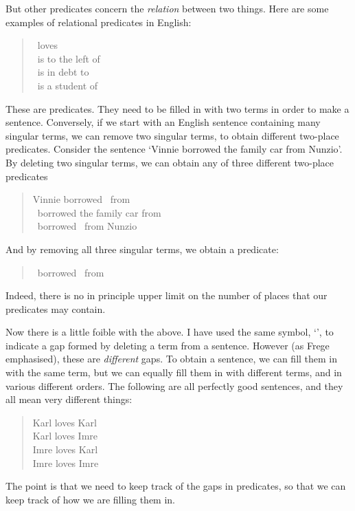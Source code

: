 But other predicates concern the \emph{relation} between two things. Here are some examples of relational predicates in English:
	\begin{quote}
		\blank\ loves \blank\\
		\blank\ is to the left of \blank\\
		\blank\ is in debt to \blank\\
		\blank\ is a student of \blank
	\end{quote}
These are  predicates. They need to be filled in with two terms in order to make a sentence. Conversely, if we start with an English sentence containing many singular terms, we can remove two singular terms, to obtain different two-place predicates. Consider the sentence `Vinnie borrowed the family car from Nunzio'. By deleting two singular terms, we can obtain any of three different two-place predicates
	\begin{quote}
		Vinnie borrowed \blank\ from \blank\\
		\blank\ borrowed the family car from \blank\\
		\blank\ borrowed \blank\ from Nunzio
	\end{quote}
And by removing all three singular terms, we  obtain a  predicate:
	\begin{quote}
		\blank\ borrowed \blank\ from \blank
	\end{quote}
Indeed, there is no in principle upper limit on the number of places that our predicates may contain.

Now there is a little foible with the above. I have used the same symbol, `\blank', to indicate a gap formed by deleting a term from a sentence. However (as Frege emphasised), these are \emph{different} gaps. To obtain a sentence, we can fill them in with the same term, but we can equally fill them in with different terms, and in various different orders. The following are all perfectly good sentences, and they all mean very different things:
	\begin{quote}
		Karl loves Karl\\
		Karl loves Imre\\
		Imre loves Karl\\
		Imre loves Imre
	\end{quote}
The point is that we need to keep track of the gaps in predicates, so that we can keep track of how we are filling them in. 


